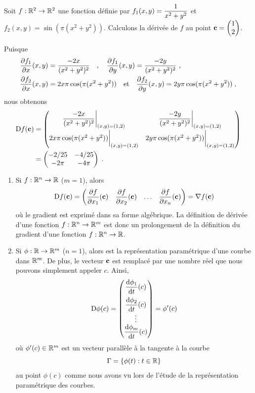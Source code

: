 {\begin{egg}
Soit $f:\mathbb{R}^2\rightarrow \mathbb{R}^2$ une fonction définie par
$\displaystyle f_1(x,y) = \frac{1}{x^2+y^2}$ et
$f_2(x,y) = \sin(\pi(x^2+y^2))$.  Calculons la dérivée de $f$ au point
$\mathbf{c} = \begin{pmatrix} 1 \\ 2 \end{pmatrix}$.

Puisque
\begin{align*}
\frac{\partial f_1}{\partial x}(x,y) &= \frac{-2x}{(x^2+y^2)^2} \quad , \quad 
\frac{\partial f_1}{\partial y}(x,y) = \frac{-2y}{(x^2+y^2)^2} \ , \\
\frac{\partial f_2}{\partial x}(x,y) &= 2x \pi \cos(\pi(x^2+y^2))
\quad \text{et} \quad 
\frac{\partial f_2}{\partial y}(x,y) = 2y \pi \cos(\pi(x^2+y^2)) \; ,
\end{align*}
nous obtenons
\begin{align*}
\mathrm{D} f(\mathbf{c}) &=
\begin{pmatrix}
\displaystyle \frac{-2x}{(x^2+y^2)^2}\bigg|_{(x,y)=(1,2)} &
\displaystyle \frac{-2y}{(x^2+y^2)^2}\bigg|_{(x,y)=(1,2)} \\[1em]
2x \pi \cos(\pi(x^2+y^2))\bigg|_{(x,y)=(1,2)} &
2y \pi \cos(\pi(x^2+y^2))\bigg|_{(x,y)=(1,2)}
\end{pmatrix} \\
&=
\begin{pmatrix}
-2/25 & -4/25 \\ -2\pi & -4\pi
\end{pmatrix} \; .
\end{align*}
\end{egg}

\begin{rmkList}
\begin{enumerate}
\item Si $f:\mathbb{R}^n\rightarrow \mathbb{R}$ ($m=1$), alors
\[
\mathrm{D} f(\mathbf{c}) =
\begin{pmatrix}
\displaystyle \frac{\partial f}{\partial x_1}(\mathbf{c}) &
\displaystyle \frac{\partial f}{\partial x_2}(\mathbf{c}) & \ldots &
\displaystyle \frac{\partial f}{\partial x_n}(\mathbf{c})
\end{pmatrix}
= \nabla f(\mathbf{c})
\]
où le gradient est exprimé dans sa forme algébrique.
La définition de dérivée d'une fonction $f:\mathbb{R}^n\rightarrow \mathbb{R}^m$ est
donc un prolongement de la définition du gradient d'une fonction
$f:\mathbb{R}^n\rightarrow \mathbb{R}$.
\item Si $\phi:\mathbb{R}\rightarrow \mathbb{R}^m$ ($n=1$), alors
est la représentation paramétrique d'une courbe dans $\mathbb{R}^m$.  De
plus, le vecteur $\mathbf{c}$ est remplacé par une nombre réel que nous pouvons
simplement appeler $c$.  Ainsi,
\[
\mathrm{D} \phi(c) =
\begin{pmatrix}
\displaystyle \frac{\mathrm{d}\phi_1}{\mathrm{d}t}(c) \\[2ex]
\displaystyle \frac{\mathrm{d}\phi_2}{\mathrm{d}t}(c) \\ \vdots \\
\displaystyle \frac{\mathrm{d}\phi_m}{\mathrm{d}t}(c)
\end{pmatrix}
= \phi'(c)
\]
où $\phi'(c) \in \mathbb{R}^m$ est un vecteur parallèle à la tangente à la
courbe
\[
\Gamma = \{ \phi(t) : t \in \mathbb{R} \}
\]
au point $\phi(c)$ comme nous avons vu lors de l'étude de la représentation
paramétrique des courbes.
\end{enumerate}
\end{rmkList}

}
